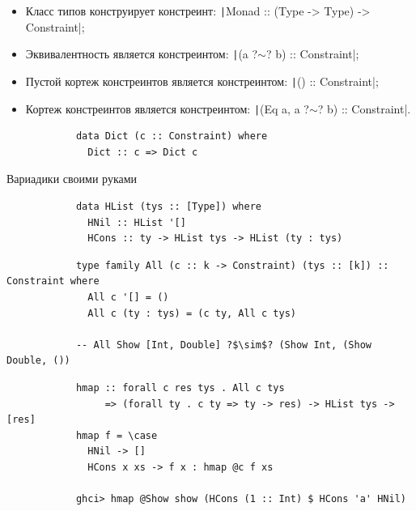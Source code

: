     \begin{frame}[fragile]{\sectionname}
        \pause
        \begin{itemize}
            \item Класс типов конструирует констреинт: \texttt|Monad :: (Type -> Type) -> Constraint|;
            \item Эквивалентность является констреинтом: \texttt|(a ?$\sim$? b) :: Constraint|;
            \item Пустой кортеж констреинтов является констреинтом: \texttt|() :: Constraint|;
            \item Кортеж констреинтов является констреинтом: \texttt|(Eq a, a ?$\sim$? b) :: Constraint|.
        \end{itemize}
        \pause\vspace{1em}
        \begin{verbatim}
            data Dict (c :: Constraint) where
              Dict :: c => Dict c
        \end{verbatim}
    \end{frame}

    \begin{frame}[fragile]{Вариадики своими руками}
        \pause
        \begin{verbatim}
            data HList (tys :: [Type]) where
              HNil :: HList '[]
              HCons :: ty -> HList tys -> HList (ty : tys)
        \end{verbatim}
        \pause\vspace{1em}
        \begin{verbatim}
            type family All (c :: k -> Constraint) (tys :: [k]) :: Constraint where
              All c '[] = ()
              All c (ty : tys) = (c ty, All c tys)

            -- All Show [Int, Double] ?$\sim$? (Show Int, (Show Double, ())
        \end{verbatim}
        \pause\vspace{1em}
        \begin{verbatim}
            hmap :: forall c res tys . All c tys
                 => (forall ty . c ty => ty -> res) -> HList tys -> [res]
            hmap f = \case
              HNil -> []
              HCons x xs -> f x : hmap @c f xs

            ghci> hmap @Show show (HCons (1 :: Int) $ HCons 'a' HNil)
        \end{verbatim}
    \end{frame}


